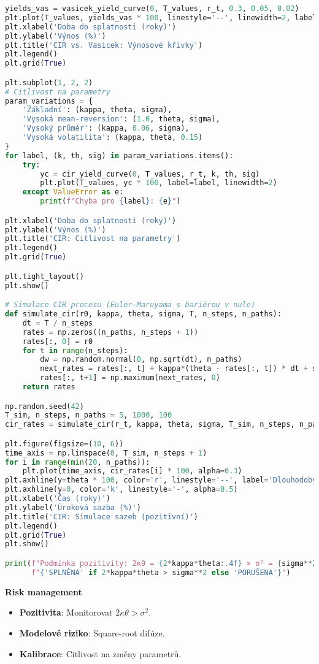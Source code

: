 \begin{example}
\begin{lstlisting}[language=Python, caption={Implementace CIR modelu v Pythonu}]
yields_vas = vasicek_yield_curve(0, T_values, r_t, 0.3, 0.05, 0.02)
plt.plot(T_values, yields_vas * 100, linestyle='--', linewidth=2, label='Vasicek')
plt.xlabel('Doba do splatnosti (roky)')
plt.ylabel('Výnos (%)')
plt.title('CIR vs. Vasicek: Výnosové křivky')
plt.legend()
plt.grid(True)

plt.subplot(1, 2, 2)
# Citlivost na parametry
param_variations = {
    'Základní': (kappa, theta, sigma),
    'Vysoká mean-reversion': (1.0, theta, sigma),
    'Vysoký průměr': (kappa, 0.06, sigma),
    'Vysoká volatilita': (kappa, theta, 0.15)
}
for label, (k, th, sig) in param_variations.items():
    try:
        yc = cir_yield_curve(0, T_values, r_t, k, th, sig)
        plt.plot(T_values, yc * 100, label=label, linewidth=2)
    except ValueError as e:
        print(f"Chyba pro {label}: {e}")

plt.xlabel('Doba do splatnosti (roky)')
plt.ylabel('Výnos (%)')
plt.title('CIR: Citlivost na parametry')
plt.legend()
plt.grid(True)

plt.tight_layout()
plt.show()

# Simulace CIR procesu (Euler–Maruyama s bariérou v nule)
def simulate_cir(r0, kappa, theta, sigma, T, n_steps, n_paths):
    dt = T / n_steps
    rates = np.zeros((n_paths, n_steps + 1))
    rates[:, 0] = r0
    for t in range(n_steps):
        dw = np.random.normal(0, np.sqrt(dt), n_paths)
        next_rates = rates[:, t] + kappa*(theta - rates[:, t]) * dt + sigma*np.sqrt(np.maximum(rates[:, t], 0))*dw
        rates[:, t+1] = np.maximum(next_rates, 0)
    return rates

np.random.seed(42)
T_sim, n_steps, n_paths = 5, 1000, 100
cir_rates = simulate_cir(r_t, kappa, theta, sigma, T_sim, n_steps, n_paths)

plt.figure(figsize=(10, 6))
time_axis = np.linspace(0, T_sim, n_steps + 1)
for i in range(min(20, n_paths)):
    plt.plot(time_axis, cir_rates[i] * 100, alpha=0.3)
plt.axhline(y=theta * 100, color='r', linestyle='--', label='Dlouhodobý průměr')
plt.axhline(y=0, color='k', linestyle='-', alpha=0.5)
plt.xlabel('Čas (roky)')
plt.ylabel('Úroková sazba (%)')
plt.title('CIR: Simulace sazeb (pozitivní)')
plt.legend()
plt.grid(True)
plt.show()

print(f"Podmínka pozitivity: 2κθ = {2*kappa*theta:.4f} > σ² = {sigma**2:.4f} -> "
      f"{'SPLNĚNA' if 2*kappa*theta > sigma**2 else 'PORUŠENA'}")
\end{lstlisting}

\noindent\textbf{Risk management}
\begin{itemize}
\item \textbf{Pozitivita}: Monitorovat $2\kappa\theta > \sigma^2$.
\item \textbf{Modelové riziko}: Square-root difúze.
\item \textbf{Kalibrace}: Citlivost na změny parametrů.
\end{itemize}


\end{example}
